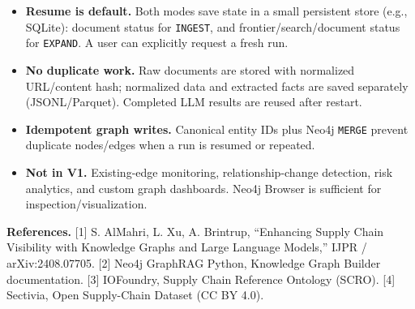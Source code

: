 \documentclass[10pt,a4paper]{article}
\begin{document}
\begin{itemize}
\item \textbf{Resume is default.} Both modes save state in a small persistent store (e.g., SQLite): document status for \texttt{INGEST}, and frontier/search/document status for \texttt{EXPAND}. A user can explicitly request a fresh run.
\item \textbf{No duplicate work.} Raw documents are stored with normalized URL/content hash; normalized data and extracted facts are saved separately (JSONL/Parquet). Completed LLM results are reused after restart.
\item \textbf{Idempotent graph writes.} Canonical entity IDs plus Neo4j \texttt{MERGE} prevent duplicate nodes/edges when a run is resumed or repeated.
\item \textbf{Not in V1.} Existing-edge monitoring, relationship-change detection, risk analytics, and custom graph dashboards. Neo4j Browser is sufficient for inspection/visualization.
\end{itemize}

\vspace{1mm}
{\footnotesize
\textbf{References.}
[1] S. AlMahri, L. Xu, A. Brintrup, ``Enhancing Supply Chain Visibility with Knowledge Graphs and Large Language Models,'' IJPR / arXiv:2408.07705.
[2] Neo4j GraphRAG Python, Knowledge Graph Builder documentation.
[3] IOFoundry, Supply Chain Reference Ontology (SCRO).
[4] Sectivia, Open Supply-Chain Dataset (CC BY 4.0).
}
\end{document}
